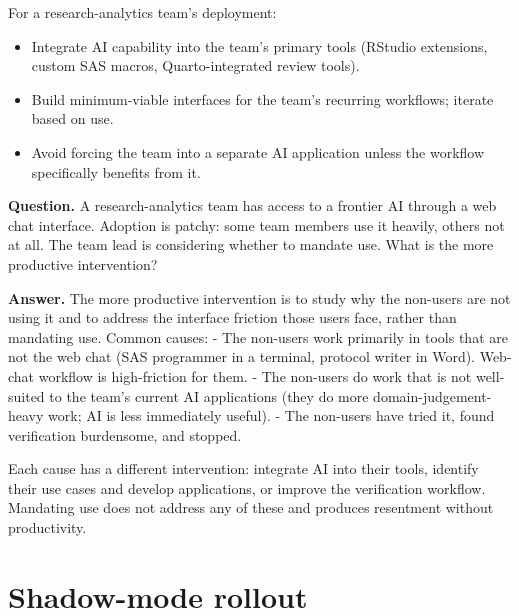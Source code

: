 \documentclass[
  letterpaper,
  11pt]{scrbook}
\providecommand{\tightlist}{%
  \setlength{\itemsep}{0pt}\setlength{\parskip}{0pt}}
\begin{document}
For a research-analytics team's deployment:

\begin{itemize}
\tightlist
\item
  Integrate AI capability into the team's primary tools (RStudio
  extensions, custom SAS macros, Quarto-integrated review tools).
\item
  Build minimum-viable interfaces for the team's recurring workflows;
  iterate based on use.
\item
  Avoid forcing the team into a separate AI application unless the
  workflow specifically benefits from it.
\end{itemize}

\begin{tcolorbox}[enhanced jigsaw, arc=.35mm, bottomrule=.15mm, bottomtitle=1mm, breakable, colback=white, colbacktitle=quarto-callout-note-color!10!white, colframe=quarto-callout-note-color-frame, coltitle=black, left=2mm, leftrule=.75mm, opacityback=0, opacitybacktitle=0.6, rightrule=.15mm, title={Check your understanding: interface and adoption}, titlerule=0mm, toprule=.15mm, toptitle=1mm]

\textbf{Question.} A research-analytics team has access to a frontier AI
through a web chat interface. Adoption is patchy: some team members use
it heavily, others not at all. The team lead is considering whether to
mandate use. What is the more productive intervention?

\textbf{Answer.} The more productive intervention is to study why the
non-users are not using it and to address the interface friction those
users face, rather than mandating use. Common causes: - The non-users
work primarily in tools that are not the web chat (SAS programmer in a
terminal, protocol writer in Word). Web-chat workflow is high-friction
for them. - The non-users do work that is not well-suited to the team's
current AI applications (they do more domain-judgement-heavy work; AI is
less immediately useful). - The non-users have tried it, found
verification burdensome, and stopped.

Each cause has a different intervention: integrate AI into their tools,
identify their use cases and develop applications, or improve the
verification workflow. Mandating use does not address any of these and
produces resentment without productivity.

\end{tcolorbox}

\section{Shadow-mode rollout}\label{shadow-mode-rollout}
\end{document}
